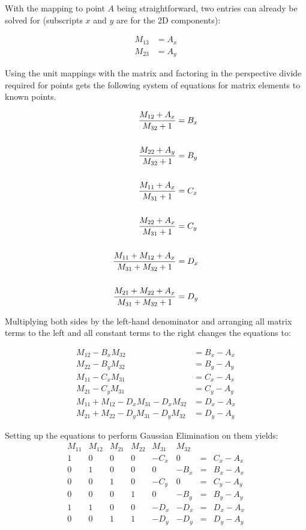 \documentclass[letterpaper, 11pt]{article}
\begin{document}
With the mapping to point \(A\) being straightforward, two 
entries can already be solved for (subscripts \(x\) and \(y\) are for the 2D components):

\begin{align}    
M_{13} &= A_x \\
M_{23} &= A_y
\end{align}

Using the unit mappings with the matrix and factoring in the perspective divide 
required for points gets the following system of equations for 
matrix elements to known points.

\begin{align}
{M_{12} + A_x}\over{M_{32} + 1} &= B_x \\ \\
{M_{22} + A_y}\over{M_{32} + 1} &= B_y \\ \\
{M_{11} + A_x}\over{M_{31} + 1} &= C_x \\ \\
{M_{22} + A_x}\over{M_{31} + 1} &= C_y \\ \\
{M_{11} + M_{12} + A_x}\over{M_{31} + M_{32} + 1} &= D_x \\ \\
{M_{21} + M_{22} + A_x}\over{M_{31} + M_{32} + 1} &= D_y
\end{align}

Multiplying both sides by the left-hand denominator and arranging all matrix
terms to the left and all constant terms to the right changes the equations to:

\begin{align}
M_{12} - B_{x}M_{32} &= B_x - A_x \\
M_{22} - B_{y}M_{32} &= B_y - A_y \\
M_{11} - C_{x}M_{31} &= C_x - A_x \\
M_{21} - C_{y}M_{31} &= C_y - A_y \\
M_{11} + M_{12} - D_{x}M_{31} - D_{x}M_{32} &= D_x - A_x \\
M_{21} + M_{22} - D_{y}M_{31} - D_{y}M_{32} &= D_y - A_y
\end{align}

Setting up the equations to perform Gaussian Elimination on them yields:
\[
\begin{array}{cccccccc}
M_{11} & M_{12} & M_{21} & M_{22} & M_{31} & M_{32} \\
1 & 0 & 0 & 0 & -C_x & 0 & = & C_x - A_x \\
0 & 1 & 0 & 0 & 0 & -B_x & = & B_x - A_x \\
0 & 0 & 1 & 0 & -C_y & 0 & = & C_y - A_y \\
0 & 0 & 0 & 1 & 0 & -B_y & = & B_y - A_y \\
1 & 1 & 0 & 0 & -D_x & -D_x & = & D_x - A_x \\
0 & 0 & 1 & 1 & -D_y & -D_y & = & D_y - A_y
\end{array}
\]
\end{document}
